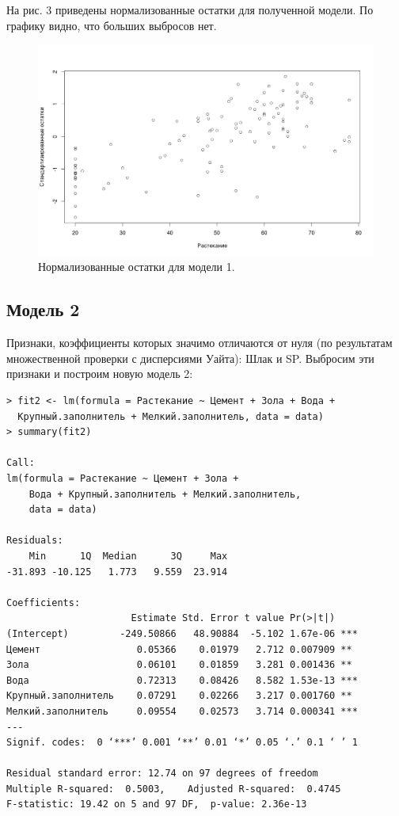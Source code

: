 \documentclass[10pt]{article}
\begin{document}
\bigskip

На рис. 3 приведены нормализованные остатки для полученной модели.
По графику видно, что больших выбросов нет.

\begin{figure}[h]
  \centering
  \includegraphics[scale=0.4]{standres.png}
  \caption{Нормализованные остатки для модели 1.}
\end{figure}

\subsection{Модель 2}

Признаки, коэффициенты которых значимо отличаются от нуля (по результатам множественной проверки с дисперсиями Уайта): Шлак и SP.
Выбросим эти признаки и построим новую модель 2:

\begin{verbatim}
> fit2 <- lm(formula = Растекание ~ Цемент + Зола + Вода +
  Крупный.заполнитель + Мелкий.заполнитель, data = data)
> summary(fit2)

Call:
lm(formula = Растекание ~ Цемент + Зола + 
    Вода + Крупный.заполнитель + Мелкий.заполнитель, 
    data = data)

Residuals:
    Min      1Q  Median      3Q     Max 
-31.893 -10.125   1.773   9.559  23.914 

Coefficients:
                      Estimate Std. Error t value Pr(>|t|)    
(Intercept)         -249.50866   48.90884  -5.102 1.67e-06 ***
Цемент                 0.05366    0.01979   2.712 0.007909 ** 
Зола                   0.06101    0.01859   3.281 0.001436 ** 
Вода                   0.72313    0.08426   8.582 1.53e-13 ***
Крупный.заполнитель    0.07291    0.02266   3.217 0.001760 ** 
Мелкий.заполнитель     0.09554    0.02573   3.714 0.000341 ***
---
Signif. codes:  0 ‘***’ 0.001 ‘**’ 0.01 ‘*’ 0.05 ‘.’ 0.1 ‘ ’ 1

Residual standard error: 12.74 on 97 degrees of freedom
Multiple R-squared:  0.5003,	Adjusted R-squared:  0.4745 
F-statistic: 19.42 on 5 and 97 DF,  p-value: 2.36e-13
\end{verbatim}
\end{document}
